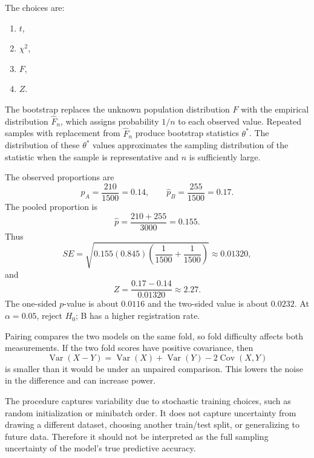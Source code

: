 \begin{solproblema}[prob:9f56f56]
The choices are:
\begin{enumerate}[label=(\alph*)]
	\item $t$,
	\item $\chi^2$,
	\item $F$,
	\item $Z$.
\end{enumerate}
\end{solproblema}

\begin{solproblema}
The bootstrap replaces the unknown population distribution $F$ with the empirical distribution $\hat F_n$, which assigns probability $1/n$ to each observed value. Repeated samples with replacement from $\hat F_n$ produce bootstrap statistics $\theta^\ast$. The distribution of these $\theta^\ast$ values approximates the sampling distribution of the statistic when the sample is representative and $n$ is sufficiently large.
\end{solproblema}

\begin{solproblema}[prob:f78153c]
The observed proportions are
\[
	\hat p_A=\frac{210}{1500}=0.14,\qquad \hat p_B=\frac{255}{1500}=0.17.
\]
The pooled proportion is
\[
	\hat p=\frac{210+255}{3000}=0.155.
\]
Thus
\[
	SE=\sqrt{0.155(0.845)\left(\frac1{1500}+\frac1{1500}\right)}\approx 0.01320,
\]
and
\[
	Z=\frac{0.17-0.14}{0.01320}\approx 2.27.
\]
The one-sided $p$-value is about $0.0116$ and the two-sided value is about $0.0232$. At $\alpha=0.05$, reject $H_0$; B has a higher registration rate.
\end{solproblema}

\begin{solproblema}
Pairing compares the two models on the same fold, so fold difficulty affects both measurements. If the two fold scores have positive covariance, then
\[
	\operatorname{Var}(X-Y)=\operatorname{Var}(X)+\operatorname{Var}(Y)-2\operatorname{Cov}(X,Y)
\]
is smaller than it would be under an unpaired comparison. This lowers the noise in the difference and can increase power.
\end{solproblema}

\begin{solproblema}[prob:cf54ef8]
The procedure captures variability due to stochastic training choices, such as random initialization or minibatch order. It does not capture uncertainty from drawing a different dataset, choosing another train/test split, or generalizing to future data. Therefore it should not be interpreted as the full sampling uncertainty of the model's true predictive accuracy.
\end{solproblema}

